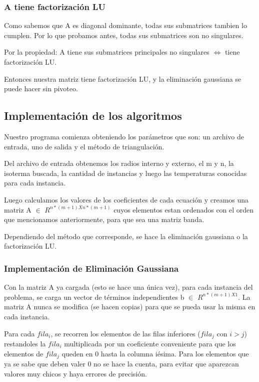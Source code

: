 
\subsubsection{A tiene factorización LU}


Como sabemos que A es diagonal dominante, todas sus submatrices tambien lo cumplen. Por lo que probamos antes, todas sus submatrices son no singulares. 

Por la propiedad: A tiene sus submatrices principales no singulares $\Leftrightarrow$ tiene factorización LU.

Entonces nuestra matriz tiene factorización LU, y la eliminación gaussiana se puede hacer sin pivoteo.




\subsection{Implementación de los algoritmos}

Nuestro programa comienza obteniendo los parámetros que son: un archivo de entrada, uno de salida y el método de triangulación. 

Del archivo de entrada obtenemos los radios interno y externo, el m y n, la isoterma buscada, la cantidad de instancias y luego las temperaturas conocidas para cada instancia.  

Luego calculamos los valores de los coeficientes de cada ecuación y creamos una matriz A $\in$ $R^{n*(m+1) X n*(m+1)}$ cuyos elementos estan ordenados con el orden que mencionamos anteriormente, para que sea una matriz banda.

Dependiendo del método que corresponde, se hace la eliminación gaussiana o la factorización LU.

\subsubsection{Implementación de Eliminación Gaussiana}

Con la matriz A ya cargada (esto se hace una única vez), para cada instancia del problema, se carga un vector de términos independientes b $\in$ $R^{n*(m+1) X 1}$. La matriz A nunca se modifica (se hacen copias) para que se pueda usar la misma en cada instancia. 

Para cada $fila_{i}$, se recorren los elementos de las filas inferiores ($fila_{j}$ con $i>j$) restandoles la $fila_{i}$ multiplicada por un coeficiente conveniente para que los elementos de $fila_{j}$ queden en 0 hasta la columna iésima. Para los elementos que ya se sabe que deben valer 0 no se hace la cuenta, para evitar que aparezcan valores muy chicos y haya errores de precisión.

